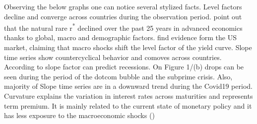 \documentclass[12pt,bibliography=totoc]{article}
\begin{document}
Observing the below graphs one can notice several stylized facts. 
Level factors decline and converge across countries during the observation period. 
\cite{holston2017measuring} point out that the natural rare r\textsuperscript{*} declined over the past 25 years in advanced economics thanks to global, macro and demographic factors. 
\cite{evans2007economic} find evidence form the US market, claiming that macro shocks shift the level factor of the yield curve.
Slope time series show countercyclical behavior and comoves across countries.
According to \cite{estrella1991term} slope factor can predict recessions.
On Figure 1/(b) drops can be seen during the period of the dotcom bubble and the subprime crisis. 
Also, majority of Slope time series are in a downward trend during the Covid19 period.
Curvature explains the variation in interest rates across maturities and represents term premium. 
It is mainly related to the current state of monetary policy and it has less exposure to the macroeconomic shocks (\cite{dewachter2006macro})
\end{document}
